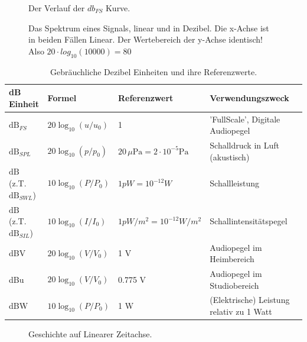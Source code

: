 


\begin{figure}[h!]
    \centering
    
    \caption{Der Verlauf der $db_{FS}$ Kurve.}
    \label{fig:dbfs}
\end{figure}


\begin{figure}[h!]
    \centering
    
    \caption{Das Spektrum eines Signals, linear und in Dezibel. Die x-Achse ist in beiden Fällen Linear. Der Wertebereich der y-Achse identisch! Also $20\cdot log_{10}(10000) = 80$}
    \label{fig:figure1}
\end{figure}


\begin{table}[h]
\centering
\begin{tabular}{|p{3.5cm}|l|l|l|p{3.5cm}|}
\hline
\textbf{dB Einheit} & \textbf{Formel} & \textbf{Referenzwert} & \textbf{Verwendungszweck} \\
\hline
$\text{dB}_{FS}$ & $20 \log_{10}(u/u_0)$ & 1 & 'FullScale', Digitale Audiopegel \\
$\text{dB}_{SPL}$  & $20 \log_{10}(p/p_0)$ & $20 \, \mu\text{Pa} = 2\cdot 10^{-5} \text{Pa}$ & Schalldruck in Luft (akustisch) \\
$\text{dB}$ (z.T. $\text{dB}_{SWL}$) & $10 \log_{10}(P/P_{0})$ & $ 1pW = 10^{-12} W$ & Schallleistung \\
$\text{dB}$ (z.T. $\text{dB}_{SIL}$)& $10 \log_{10}(I/I_{0})$ & $ 1pW/m^2 = 10^{-12} W/m^2$ & Schallintensitätspegel \\
dBV & $20 \log_{10}(V/V_0)$ & 1 V & Audiopegel im Heimbereich \\
dBu & $20 \log_{10}(V/V_0)$ & 0.775 V  & Audiopegel im Studiobereich \\
dBW & $10 \log_{10}(P/P_0)$ & 1 W  & (Elektrische) Leistung relativ zu 1 Watt \\
\hline
\end{tabular}
\caption{Gebräuchliche Dezibel Einheiten und ihre Referenzwerte.}
\end{table}

\begin{figure}[h!]
    \centering
    
    \caption{Geschichte auf Linearer Zeitachse.}
    \label{fig:time_lin}
\end{figure}


